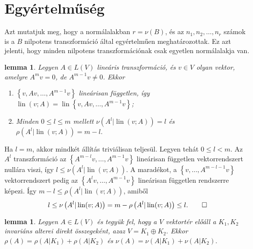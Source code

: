 \documentclass[9pt, a4paper, showtrims]{memoir}
\makeatletter
\renewenvironment{proof}[1][\proofname]
    {\par\pushQED{\qed}%
    \normalfont \topsep6\p@\@plus6\p@\relax
    \trivlist
    \item[\hskip\labelsep
        \itshape
    #1\@addpunct{:}]\ignorespaces}
    {\popQED\endtrivlist\@endpefalse}
\theoremstyle{plain}
\newtheorem{lemma}[proposition]{lemma}
\theoremstyle{remark}
\theoremstyle{definition}
\DeclareMathOperator{\lin}{lin}
\makeatother
\begin{document}
\section{Egyértelműség}
Azt mutatjuk meg, hogy a normálalakban $r=\nu\left( B \right)$,
és az $n_1,n_2,\ldots,n_r$ számok is a $B$ nilpotens transzformáció által egyértelműen meghatározottak.
Ez azt jelenti, hogy minden nilpotens transzformációnak csak egyetlen normálalakja van.
\begin{lemma}
	Legyen $A\in L\left( V \right)$ lineáris transzformáció, és $v\in V$ olyan vektor, amelyre
	$A^mv=0$, de $A^{m-1}v\neq 0$.
	Ekkor
	\begin{enumerate}
		\item
		      $\left\{ v,Av,\ldots,A^{m-1}v \right\}$ lineárisan független,
		      így $\lin(v;A )=\lin\left\{ v,Av,\ldots,A^{m-1}v \right\}$;
		\item
		      Minden $0\leq l\leq m$ mellett
		      \begin{math}
			      \nu\left( A^l|\lin(v;A) \right)=l
		      \end{math}
		      és
		      \begin{math}
			      \rho\left( A^l|\lin(v;A) \right)=m-l.
		      \end{math}\qedhere
	\end{enumerate}
\end{lemma}
\begin{proof}
	Ha $l=m$, akkor mindkét állítás triviálisan teljesül. Legyen tehát $0\leq l<m$.
	Az $A^l$ transzformáció az $\left\{ A^{m-l}v,\ldots,A^{m-1}v \right\}$
	lineárisan független vektorrendszert nullára viszi,
	így $l\leq\nu\left( A^l|\lin(v;A)\right)$.
	A maradékot, a
	$\left\{ v,\ldots,A^{m-l-1}v \right\}$ vektorrendszert pedig az
	$\left\{ A^lv,\ldots,A^{m-1}v \right\}$ lineárisan független rendszerre képezi.
	Így
	$m-l\leq \rho\left( A^l |\lin(v;A)\right)$,
	amiből
	\[
		l\leq\nu\left( A^l|\lin(v;A) \right)=m-\rho\left( A^l|\lin(v;A) \right)\leq l.\qedhere
	\]
\end{proof}
\begin{lemma}
	Legyen $A\in L\left( V \right)$ és tegyük fel, hogy a $V$ vektortér előáll a $K_1,K_2$ invariáns alterei
	direkt összegeként, azaz
	\(
	V=K_1\oplus K_2.
	\)
	Ekkor
	\begin{math}
		\rho\left( A \right)=\rho\left( A|K_1 \right)+\rho\left( A|K_2 \right)
	\end{math}
	és
	\begin{math}
		\nu\left( A \right)=\nu\left( A|K_1 \right)+\nu\left( A|K_2 \right).
	\end{math}
	\qedhere
\end{lemma}
\end{document}

